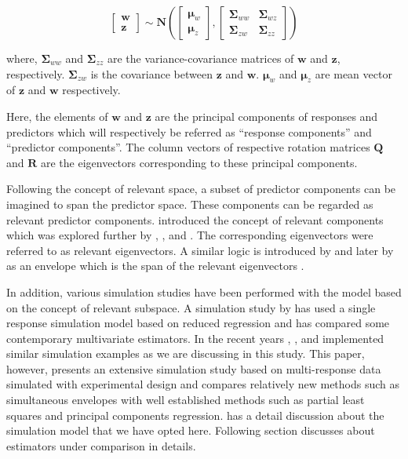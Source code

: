 \documentclass[12pt,3p,authoryear]{elsarticle}
\begin{document}
\begin{equation}
  \begin{bmatrix}
    \mathbf{w} \\ \mathbf{z}
  \end{bmatrix} \sim \mathbf{N}
  \left(
    \begin{bmatrix}
      \boldsymbol{\mu}_w \\
      \boldsymbol{\mu}_z
    \end{bmatrix},
    \begin{bmatrix}
    \boldsymbol{\Sigma}_{ww} & \boldsymbol{\Sigma}_{wz} \\
    \boldsymbol{\Sigma}_{zw} & \boldsymbol{\Sigma}_{zz}
    \end{bmatrix}
  \right)
  \label{eq:model-2}
\end{equation}

where, \(\boldsymbol{\Sigma}_{ww}\) and \(\boldsymbol{\Sigma}_{zz}\) are
the variance-covariance matrices of \(\mathbf{w}\) and \(\mathbf{z}\),
respectively. \(\boldsymbol{\Sigma}_{zw}\) is the covariance between
\(\mathbf{z}\) and \(\mathbf{w}\). \(\boldsymbol{\mu}_w\) and
\(\boldsymbol{\mu}_z\) are mean vector of \(\mathbf{z}\) and
\(\mathbf{w}\) respectively.

Here, the elements of \(\mathbf{w}\) and \(\mathbf{z}\) are the
principal components of responses and predictors which will respectively
be referred as ``response components'' and ``predictor components''. The
column vectors of respective rotation matrices \(\mathbf{Q}\) and
\(\mathbf{R}\) are the eigenvectors corresponding to these principal
components.

Following the concept of relevant space, a subset of predictor
components can be imagined to span the predictor space. These components
can be regarded as relevant predictor components. \citet{Naes1985}
introduced the concept of relevant components which was explored further
by \citet{helland1990partial}, \citet{naes1993relevant},
\citet{Helland1994b} and \citet{Helland2000}. The corresponding
eigenvectors were referred to as relevant eigenvectors. A similar logic
is introduced by \citet{cook2010envelope} and later by
\citet{cook2013envelopes} as an envelope which is the span of the
relevant eigenvectors \citep[pp.~101]{cook2018envelope}.

In addition, various simulation studies have been performed with the
model based on the concept of relevant subspace. A simulation study by
\citet{Alm_y_1996} has used a single response simulation model based on
reduced regression and has compared some contemporary multivariate
estimators. In the recent years \citet{helland2012near},
\citet{saebo2015simrel}, \citet{helland2016algorithms} and
\citet{Rimal2018} implemented similar simulation examples as we are
discussing in this study. This paper, however, presents an extensive
simulation study based on multi-response data simulated with
experimental design and compares relatively new methods such as
simultaneous envelopes with well established methods such as partial
least squares and principal components regression. \citet{Rimal2018} has
a detail discussion about the simulation model that we have opted here.
Following section discusses about estimators under comparison in
details.
\end{document}
